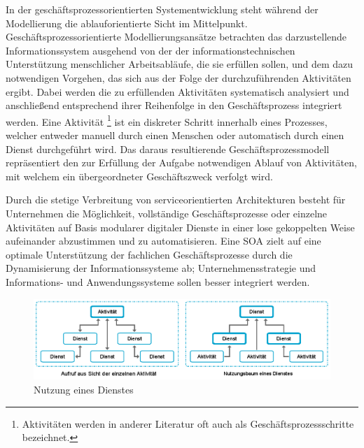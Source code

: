 In der geschäftsprozessorientierten Systementwicklung steht während der Modellierung die ablauforientierte Sicht im Mittelpunkt.
Geschäftsprozessorientierte Modellierungsansätze betrachten das darzustellende Informationssystem ausgehend von der der informationstechnischen Unterstützung menschlicher Arbeitsabläufe, die sie erfüllen sollen, und dem dazu notwendigen Vorgehen, das sich aus der Folge der durchzuführenden Aktivitäten ergibt.
\cite{Wolf.2016}
Dabei werden die zu erfüllenden Aktivitäten systematisch analysiert und anschließend entsprechend ihrer Reihenfolge in den Geschäftsprozess integriert werden.
Eine Aktivität \footnote{Aktivitäten werden in anderer Literatur oft auch als Geschäftsprozessschritte bezeichnet.} ist ein diskreter Schritt innerhalb eines Prozesses, welcher entweder manuell durch einen Menschen oder automatisch durch einen Dienst durchgeführt wird.
\cite{Benker.2016}
Das daraus resultierende Geschäftsprozessmodell repräsentiert den zur Erfüllung der Aufgabe notwendigen Ablauf von Aktivitäten, mit welchem ein übergeordneter Geschäftszweck verfolgt wird.

Durch die stetige Verbreitung von serviceorientierten Architekturen besteht für Unternehmen die Möglichkeit, vollständige Geschäftsprozesse oder einzelne Aktivitäten auf Basis modularer digitaler Dienste in einer lose gekoppelten Weise aufeinander abzustimmen und zu automatisieren. 
\cite{Masak.2007}
Eine \ac{SOA} zielt auf eine optimale Unterstützung der fachlichen Geschäftsprozesse durch die Dynamisierung der Informationssysteme ab; Unternehmensstrategie und Informations- und Anwendungssysteme sollen besser integriert werden.
\cite{Teusch.2016}

\begin{figure}[H]
	\centering 
    \includegraphics[width=\textwidth]{img/Serviceaufbau.png}	
    \caption[Nutzung eines Dienstes]
    {Nutzung eines Dienstes  \protect\footnotemark}
    \label{fig:Nutzung eines Dienstes}
\end{figure}

